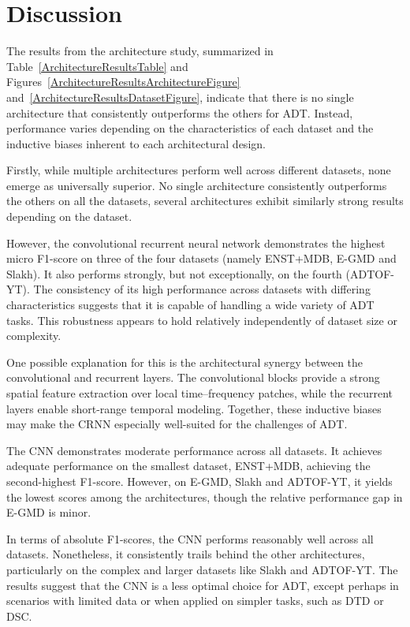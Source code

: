 \section{Discussion}

The results from the architecture study, summarized in Table~\ref{ArchitectureResultsTable} and Figures~\ref{ArchitectureResultsArchitectureFigure} and~\ref{ArchitectureResultsDatasetFigure}, indicate that there is no single architecture that consistently outperforms the others for \gls{ADT}. Instead, performance varies depending on the characteristics of each dataset and the inductive biases inherent to each architectural design.

Firstly, while multiple architectures perform well across different datasets, none emerge as universally superior. No single architecture consistently outperforms the others on all the datasets, several architectures exhibit similarly strong results depending on the dataset. 

However, the convolutional recurrent neural network demonstrates the highest micro F1-score on three of the four datasets (namely ENST+MDB, E-GMD and Slakh). It also performs strongly, but not exceptionally, on the fourth (ADTOF-YT). The consistency of its high performance across datasets with differing characteristics suggests that it is capable of handling a wide variety of \gls{ADT} tasks. This robustness appears to hold relatively independently of dataset size or complexity. 

One possible explanation for this is the architectural synergy between the convolutional and recurrent layers. The convolutional blocks provide a strong spatial feature extraction over local time–frequency patches, while the recurrent layers enable short-range temporal modeling. Together, these inductive biases may make the \gls{CRNN} especially well-suited for the challenges of \gls{ADT}.

The \acrfull{CNN} demonstrates moderate performance across all datasets. It achieves adequate performance on the smallest dataset, ENST+MDB, achieving the second-highest F1-score. However, on E-GMD, Slakh and ADTOF-YT, it yields the lowest scores among the architectures, though the relative performance gap in E-GMD is minor. 

In terms of absolute F1-scores, the \gls{CNN} performs reasonably well across all datasets. Nonetheless, it consistently trails behind the other architectures, particularly on the complex and larger datasets like Slakh and ADTOF-YT. The results suggest that the \gls{CNN} is a less optimal choice for \gls{ADT}, except perhaps in scenarios with limited data or when applied on simpler tasks, such as \gls{DTD} or \acrfull{DSC}. 


